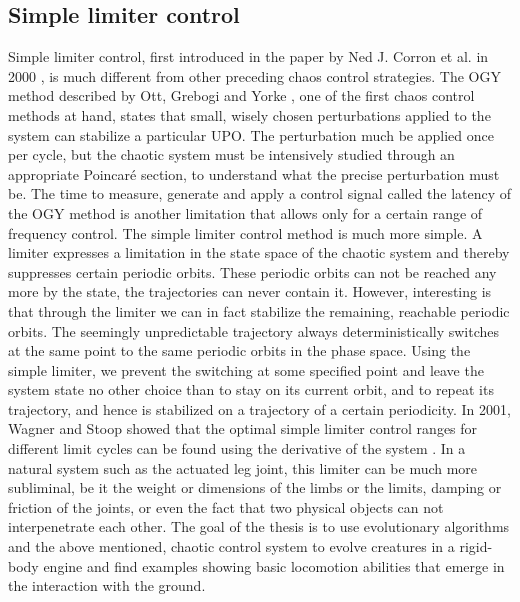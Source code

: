 \documentclass[main]{subfiles}
\begin{document}
\subsection{Simple limiter control}

Simple limiter control, first introduced in the paper by Ned J. Corron et al. in 2000 \cite{bib:Corron2000}, is much different from other preceding chaos control strategies. %
%
The OGY method described by Ott, Grebogi and Yorke \cite{bib:Ott1990}, one of the first chaos control methods at hand, states that small, wisely chosen perturbations applied to the system can stabilize a particular UPO. %
%
The perturbation much be applied once per cycle, but the chaotic system must be intensively studied through an appropriate Poincaré section, to understand what the precise perturbation must be. %
%
The time to measure, generate and apply a control signal called the latency of the OGY method is another limitation that allows only for a certain range of frequency control. %
%
The simple limiter control method is much more simple. A limiter expresses a limitation in the state space of the chaotic system and thereby suppresses certain periodic orbits. %
%
These periodic orbits can not be reached any more by the state, the trajectories can never contain it. %
%
However, interesting is that through the limiter we can in fact stabilize the remaining, reachable periodic orbits. %
%
The seemingly unpredictable trajectory always deterministically switches at the same point to the same periodic orbits in the phase space. %
%
Using the simple limiter, we prevent the switching at some specified point and leave the system state no other choice than to stay on its current orbit, and to repeat its trajectory, and hence is stabilized on a trajectory of a certain periodicity. %
%
In 2001, Wagner and Stoop showed that the optimal simple limiter control ranges for different limit cycles can be found using the derivative of the system \cite{bib:Wagner2001}. %
%
In a natural system such as the actuated leg joint, this limiter can be much more subliminal, be it the weight or dimensions of the limbs or the limits, damping or friction of the joints, or even the fact that two physical objects can not interpenetrate each other. %
%
The goal of the thesis is to use evolutionary algorithms and the above mentioned, chaotic control system to evolve creatures in a rigid-body engine and find examples showing basic locomotion abilities that emerge in the interaction with the ground.
\end{document}

